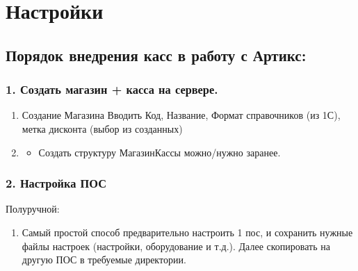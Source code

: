 \documentclass[twoside,11pt,a4paper,notitlepage]{report}
\begin{document}
\sphinxstepscope


\chapter{Настройки}
\label{\detokenize{setting:id1}}\label{\detokenize{setting::doc}}
\sphinxstepscope


\section{Порядок внедрения касс в работу с Артикс:}
\label{\detokenize{kass:id1}}\label{\detokenize{kass::doc}}

\subsection{1. Создать магазин + касса на сервере.}
\label{\detokenize{kass:id2}}\begin{enumerate}
%
\item {} 
\sphinxAtStartPar
Создание Магазина \sphinxhyphen{} Вводить Код, Название, Формат справочников (из 1С), метка дисконта (выбор из созданных)

\item {} \begin{description}
\begin{itemize}
\item {} 
\sphinxAtStartPar
Создать структуру Магазин\sphinxhyphen{}Кассы можно/нужно заранее.

\end{itemize}

\end{description}

\end{enumerate}


\subsection{2. Настройка ПОС}
\label{\detokenize{kass:id3}}
\sphinxAtStartPar
Полуручной:
\begin{enumerate}
%
\item {} 
\sphinxAtStartPar
Самый простой способ предварительно настроить 1 пос, и сохранить нужные файлы настроек (настройки, оборудование и т.д.). Далее скопировать на другую ПОС в требуемые директории.

\end{enumerate}
\end{document}
